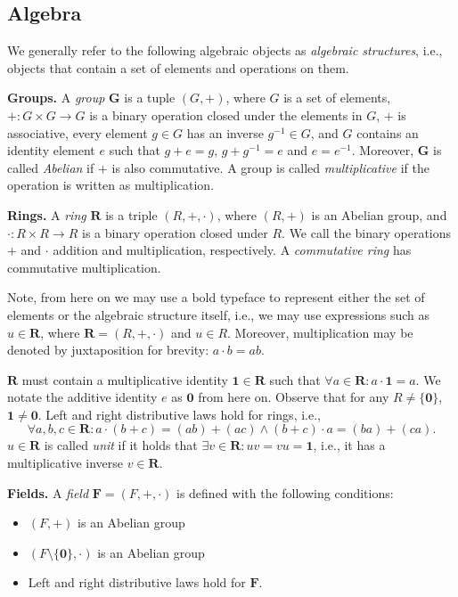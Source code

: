 \subsection{Algebra} 
\label{sect:prelims_algebra}

We generally refer to the following algebraic objects 
as \emph{algebraic structures}, i.e., objects that contain a 
set of elements and operations on them.

\textbf{Groups.} A \emph{group} $\mathbf G$
is a tuple $(G, +)$, where $G$ is a set of elements, 
$+ \colon G \times G \to G$ 
is a binary operation closed under 
the elements in $G$, $+$ is associative, every element $g \in G$ 
has an inverse $g^{-1}\in G$, and $G$ contains 
an identity element $e$ such that $g + e = g$, $g + g^{-1} = e$ and $e = e^{-1}$. 
Moreover, $\mathbf G$ is called \emph{Abelian} if 
$+$ is also commutative. A group is called \emph{multiplicative} if the operation 
is written as multiplication.

\textbf{Rings.} A \emph{ring} $\mathbf R$ is a triple $(R,+,\cdot)$, 
where $(R, +)$ is an Abelian group, and $\cdot \colon R \times R \to R$ 
is a binary operation closed under $R$. We call the binary operations $+$ and $\cdot$ 
addition and multiplication, respectively. A \emph{commutative ring} has commutative multiplication. 

Note, from here on we may use a bold typeface to represent either the set of elements 
or the algebraic structure itself, i.e., 
we may use expressions such as $u \in \mathbf{R}$, where $\mathbf{R} = (R,+,\cdot)$ and $u \in R$. 
Moreover, multiplication may be denoted by juxtaposition for brevity: $a\cdot b = ab$. 

$\mathbf{R}$ must contain a multiplicative identity 
$\mathbf{1} \in \mathbf{R}$ such that $\forall a \in \mathbf{R} \colon a \cdot \mathbf{1} = a$. 
We notate the additive identity $e$ 
as $\mathbf{0}$ from here on. 
Observe that for any $R \neq \{\mathbf{0}\}$, $\mathbf{1} \neq \mathbf{0}$. 
Left and right distributive laws hold for rings, i.e., 
\[
  \forall a, b, c \in \mathbf{R} \colon a \cdot (b + c) = (ab) + (ac) \land (b + c) \cdot a = (ba) + (ca).
\]
$u \in \mathbf{R}$ is called \emph{unit} if it holds 
that $\exists v \in \mathbf{R} \colon uv = vu = \mathbf{1}$, 
i.e., it has a multiplicative inverse $v \in \mathbf{R}$.

\textbf{Fields.} A \emph{field} $\mathbf{F} = (F, +, \cdot)$ is defined with the following conditions:
\begin{itemize}
  \item $(F, +)$ is an Abelian group
  \item $(F\setminus \{\mathbf{0}\}, \cdot )$ is an Abelian group
  \item Left and right distributive laws hold for $\mathbf{F}$.
\end{itemize}


